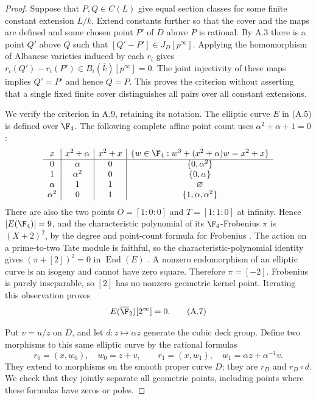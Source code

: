 \begin{proof}
Suppose that $P,Q\in C(L)$ give equal section classes for some
finite constant extension $L/k$. Extend constants further so that
the cover and the maps are defined and some chosen point $P'$ of
$D$ above $P$ is rational. By A.3 there is a point $Q'$ above $Q$
such that $[Q'-P']\in J_D[p^\infty]$. Applying the homomorphism
of Albanese varieties induced by each $r_i$ gives
$r_i(Q')-r_i(P')\in B_i(\overline k)[p^\infty]=0$.
The joint injectivity of these maps implies $Q'=P'$ and hence
$Q=P$. This proves the criterion without asserting that a
single fixed finite cover distinguishes all pairs over all
constant extensions.

We verify the criterion in A.9, retaining its notation. The
elliptic curve $E$ in (A.5) is defined over $\F_4$. The following
complete affine point count uses $\alpha^2+\alpha+1=0$:
\[
\begin{array}{c|c|c|c}
 x&x^2+\alpha&x^2+x&\{w\in\F_4:w^3+(x^2+\alpha)w=x^2+x\}\\
 \hline
 0&\alpha&0&\{0,\alpha^2\}\\
 1&\alpha^2&0&\{0,\alpha\}\\
 \alpha&1&1&\varnothing\\
 \alpha^2&0&1&\{1,\alpha,\alpha^2\}
\end{array}
\]
There are also the two points $O=[1:0:0]$ and
$T=[1:1:0]$ at infinity. Hence $|E(\F_4)|=9$, and the
characteristic polynomial of its $\F_4$-Frobenius $\pi$ is
$(X+2)^2$, by the degree and point-count formula for Frobenius
\citep[II, Theorem 1.1]{A_Milne2008}. The action on a prime-to-two
Tate module is faithful, so the characteristic-polynomial
identity gives $(\pi+[2])^2=0$ in $\operatorname{End}(E)$
\citep[I, Theorem 10.15]{A_Milne2008}.
A nonzero endomorphism of an elliptic curve is an isogeny and
cannot have zero square. Therefore $\pi=[-2]$. Frobenius is
purely inseparable, so $[2]$ has no nonzero geometric kernel
point. Iterating this observation proves
\[
 E(\overline{\F}_2)[2^\infty]=0.                                  \tag{A.7}
\]

Put $v=u/z$ on $D$, and let $d:z\mapsto\alpha z$ generate the
cubic deck group. Define two morphisms to this same elliptic
curve by the rational formulas
\[
 r_0=(x,w_0),\quad w_0=z+v,
 \qquad
 r_1=(x,w_1),\quad w_1=\alpha z+\alpha^{-1}v.
\]
They extend to morphisms on the smooth proper curve $D$; they
are $r_D$ and $r_D\circ d$. We check that they jointly separate
all geometric points, including points where these formulas
have zeros or poles.


\end{proof}
